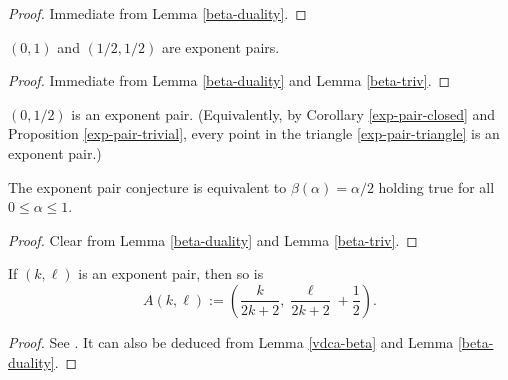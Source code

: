 \begin{proof} Immediate from Lemma \ref{beta-duality}.
\end{proof}

\begin{proposition}\label{exp-pair-trivial}
$(0,1)$ and $(1/2,1/2)$ are exponent pairs.
\end{proposition}


\begin{proof} Immediate from Lemma \ref{beta-duality} and Lemma \ref{beta-triv}.
\end{proof}

\begin{conjecture}\label{exp-pair-conj}
$(0,1/2)$ is an exponent pair.  (Equivalently, by Corollary \ref{exp-pair-closed} and Proposition \ref{exp-pair-trivial}, every point in the triangle \eqref{exp-pair-triangle} is an exponent pair.)
\end{conjecture}



\begin{lemma}\label{exp-pair-conj-beta}
\leanok
The exponent pair conjecture is equivalent to $\beta(\alpha)=\alpha/2$ holding true for all $0 \leq \alpha \leq 1$.
\end{lemma}

\begin{proof} Clear from Lemma \ref{beta-duality} and Lemma \ref{beta-triv}.
\end{proof}

\begin{proposition}\label{vdc-a}
If $(k,\ell)$ is an exponent pair, then so is
    $$A(k,\ell) := \left(\frac{k}{2k+2}, \frac{\ell}{2k+2} + \frac{1}{2}\right).$$
\end{proposition}

\literature
{}

\begin{proof} See \cite[Lemma 2.8]{ivic}. It can also be deduced from Lemma \ref{vdca-beta} and Lemma \ref{beta-duality}.
\end{proof}

